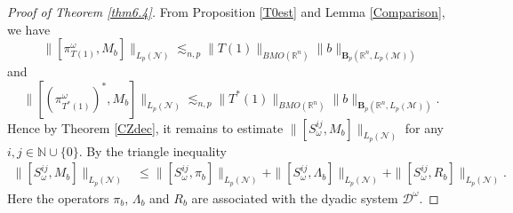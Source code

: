 \documentclass[oneside,english,a4wide]{amsart}
\numberwithin{equation}{section}
\numberwithin{figure}{section}
\theoremstyle{plain}
\theoremstyle{plain}
\theoremstyle{definition}
\theoremstyle{plain}
\theoremstyle{remark}
\theoremstyle{definition}
\theoremstyle{remark}
\theoremstyle{definition}
\newcommand{\8}{\infty}
\begin{document}
\begin{proof}[Proof of Theorem \ref{thm6.4}]
	From  Proposition \ref{T0est} and Lemma \ref{Comparison}, we have
	\begin{equation*}
		\|[\pi_{T(1)}^{\omega}, M_b]\|_{L_p(\mathcal{N})}\lesssim_{n,p}\|T(1)\|_{BMO(\mathbb{R}^n)} \|b\|_{\pmb{B}_p(\mathbb{R}^n,L_p(\mathcal{M}))}
	\end{equation*}
	and
	\begin{equation*}
		\|[(\pi_{T^*(1)}^{\omega})^*, M_b]\|_{L_p(\mathcal{N})}\lesssim_{n,p} \|T^*(1)\|_{BMO(\mathbb{R}^n)} \|b\|_{\pmb{B}_p(\mathbb{R}^n,L_p(\mathcal{M}))}.
	\end{equation*}
	Hence by Theorem \ref{CZdec}, it remains to estimate $\|[S_\omega^{ij}, M_b]\|_{L_p(\mathcal{N})}$ for any $i, j\in \mathbb{N}\cup\{0\}$. By the triangle inequality
	\begin{equation*}
		\begin{aligned}
			\|[S_\omega^{ij},M_b]\|_{L_p(\mathcal{N})}{}&\le \|[S_\omega^{ij},\pi_b]\|_{L_p(\mathcal{N})}+\|[S_\omega^{ij},\varLambda_b]\|_{L_p(\mathcal{N})}
			+\|[S_\omega^{ij},R_b]\|_{L_p(\mathcal{N})}.
		\end{aligned}
	\end{equation*}
	Here the operators $\pi_b$, $\varLambda_b$ and $R_b$ are associated with the dyadic system $\mathcal{ D}^\omega$.
	

\end{proof}
\end{document}
